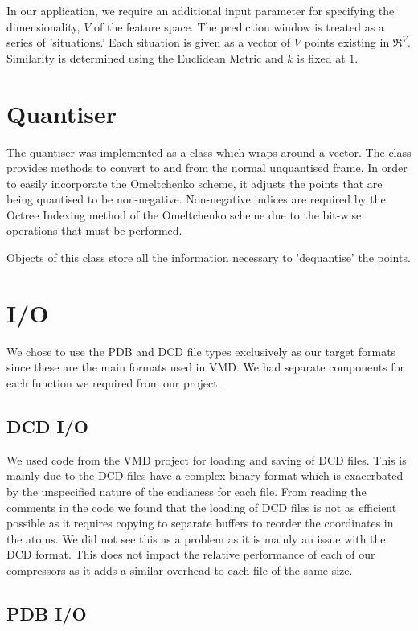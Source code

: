 \documentclass[a4paper,11pt]{report}
\begin{document}
In our application, we require an additional input parameter for specifying the dimensionality, $V$ of the feature space. The prediction window is treated as a series of 'situations.' Each situation is given as a vector of $V$ points existing in $\Re^V$. Similarity is determined using the Euclidean Metric and $k$ is fixed at $1$.

\section{Quantiser}

The quantiser was implemented as a class which wraps around a vector. The class provides methods to convert to and from the normal unquantised frame. In order to easily incorporate the Omeltchenko scheme, it adjusts the points that are being quantised to be non-negative. Non-negative indices are required by the Octree Indexing method of the Omeltchenko scheme due to the bit-wise operations that must be performed.

Objects of this class store all the information necessary to 'dequantise' the points.

\section{I/O}

We chose to use the PDB and DCD file types exclusively as our target formats since these are the main formats used in VMD. We had separate components for each function we required from our project. 

\subsection{DCD I/O}

We used code from the VMD project for loading and saving of DCD files. This is mainly due to the DCD files have a complex binary format which is exacerbated by the unspecified nature of the endianess for each file. From reading the comments in the code we found that the loading of DCD files is not as efficient possible as it requires copying to separate buffers to reorder the coordinates in the atoms. We did not see this as a problem as it is mainly an issue with the DCD format. This does not impact the relative performance of each of our compressors as it adds a similar overhead to each file of the same size.

\subsection{PDB I/O}
\end{document}
